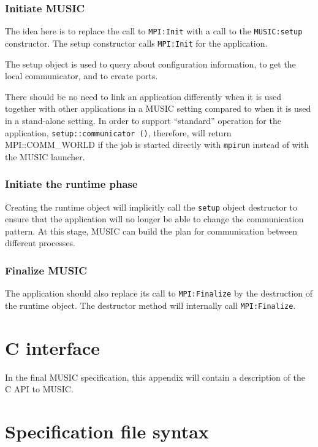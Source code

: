 \documentclass[a4paper]{report}
\begin{document}
\subsection{Initiate MUSIC}

The idea here is to replace the call to \lstinline|MPI:Init| with a
call to the \lstinline|MUSIC:setup| constructor.  The setup
constructor calls \lstinline|MPI:Init| for the application.

The setup object is used to query about configuration information, to
get the local communicator, and to create ports.

There should be no need to link an application differently when it is
used together with other applications in a MUSIC setting compared to
when it is used in a stand-alone setting.  In order to support
``standard'' operation for the application,
\lstinline|setup::communicator ()|, therefore, will return
MPI::COMM\_WORLD if the job is started directly with
\lstinline|mpirun| instead of with the MUSIC launcher.


\subsection{Initiate the runtime phase}

Creating the runtime object will implicitly call the \lstinline|setup|
object destructor to ensure that the application will no longer be
able to change the communication pattern.  At this stage, MUSIC can
build the plan for communication between different processes.

\subsection{Finalize MUSIC}

The application should also replace its call to
\lstinline|MPI:Finalize| by the destruction of the runtime object.
The destructor method will internally call \lstinline|MPI:Finalize|.


\appendix

\chapter{C interface}

In the final MUSIC specification, this appendix will contain a
description of the C API to MUSIC.


\chapter{Specification file syntax}
\label{sec:specsyntax}
\end{document}
